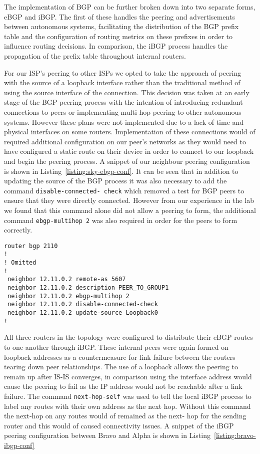 The implementation of BGP can be further broken down into two separate forms,
eBGP and iBGP. The first of these handles the peering and advertisements
between autonomous systems, facilitating the distribution of the BGP prefix
table and the configuration of routing metrics on these prefixes in order to
influence routing decisions. In comparison, the iBGP process handles the
propagation of the prefix table throughout internal routers.

For our ISP's peering to other ISPs we opted to take the approach of peering
with the source of a loopback interface rather than the traditional method of
using the source interface of the connection. This decision was taken at an
early stage of the BGP peering process with the intention of introducing
redundant connections to peers or implementing multi-hop peering to other
autonomous systems. However these plans were not implemented due to a lack of
time and physical interfaces on some routers. Implementation of these
connections would of required additional configuration on our peer's networks
as they would need to have configured a static route on their device in order
to connect to our loopback and begin the peering process. A snippet of our
neighbour peering configuration is shown in Listing~\ref{listing:sky-ebgp-conf}.
It can be seen that in addition to updating the source of the BGP
process it was also necessary to add the command \texttt{disable-connected-
check} which removed a test for BGP peers to ensure that they were directly
connected. However from our experience in the lab we found that this command
alone did not allow a peering to form, the additional command \texttt{ebgp-multihop 2}
was also required in order for the peers to form correctly.

\begin{lstlisting}[caption={BT-Sky eBGP Configuration}, label={listing:sky-ebgp-conf}]
router bgp 2110
!
! Omitted
!
 neighbor 12.11.0.2 remote-as 5607
 neighbor 12.11.0.2 description PEER_TO_GROUP1
 neighbor 12.11.0.2 ebgp-multihop 2
 neighbor 12.11.0.2 disable-connected-check
 neighbor 12.11.0.2 update-source Loopback0
!
\end{lstlisting}

All three routers in the topology were configured to distribute their eBGP
routes to one-another through iBGP. These internal peers were again formed on
loopback addresses as a countermeasure for link failure between the routers
tearing down peer relationships. The use of a loopback allows the peering to
remain up after IS-IS converges, in comparison using the interface address
would cause the peering to fail as the IP address would not be reachable after
a link failure. The command \texttt{next-hop-self} was used to tell the local
iBGP process to label any routes with their own address as the next hop.
Without this command the next-hop on any routes would of remained as the next-
hop for the sending router and this would of caused connectivity issues. A
snippet of the iBGP peering configuration between Bravo and Alpha is shown in
Listing~\ref{listing:bravo-ibgp-conf}

